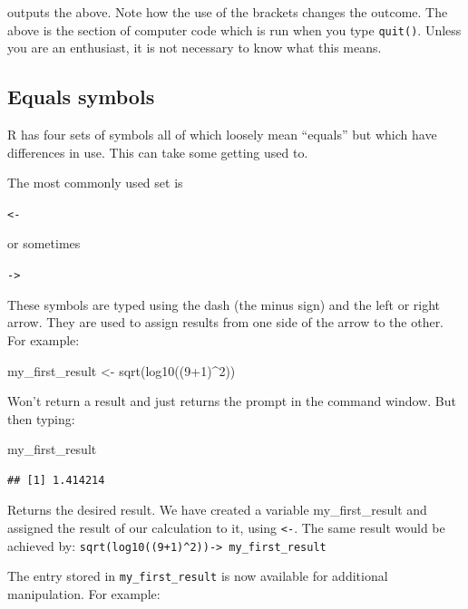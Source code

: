 \documentclass[
]{book}
\newenvironment{Shaded}{\begin{snugshade}}{\end{snugshade}}
\newcommand{\DecValTok}[1]{\textcolor[rgb]{0.00,0.00,0.81}{#1}}
\newcommand{\FunctionTok}[1]{\textcolor[rgb]{0.00,0.00,0.00}{#1}}
\newcommand{\NormalTok}[1]{#1}
\newcommand{\OtherTok}[1]{\textcolor[rgb]{0.56,0.35,0.01}{#1}}
\newcommand{\SpecialCharTok}[1]{\textcolor[rgb]{0.00,0.00,0.00}{#1}}
\begin{document}
outputs the above. Note how the use of the brackets changes the outcome. The above is the section of computer code which is run when you type \texttt{quit()}. Unless you are an enthusiast, it is not necessary to know what this means.

\hypertarget{equals-symbols}{%
\subsection{Equals symbols}\label{equals-symbols}}

R has four sets of symbols all of which loosely mean ``equals'' but which have differences in use. This can take some getting used to.

The most commonly used set is

\texttt{\textless{}-}

or sometimes

\texttt{-\textgreater{}}

These symbols are typed using the dash (the minus sign) and the left or right arrow. They are used to assign results from one side of the arrow to the other. For example:

\begin{Shaded}
\begin{Highlighting}[]
\NormalTok{my\_first\_result }\OtherTok{\textless{}{-}} \FunctionTok{sqrt}\NormalTok{(}\FunctionTok{log10}\NormalTok{((}\DecValTok{9}\SpecialCharTok{+}\DecValTok{1}\NormalTok{)}\SpecialCharTok{\^{}}\DecValTok{2}\NormalTok{))}
\end{Highlighting}
\end{Shaded}

Won't return a result and just returns the prompt in the command window. But then typing:

\begin{Shaded}
\begin{Highlighting}[]
\NormalTok{my\_first\_result}
\end{Highlighting}
\end{Shaded}

\begin{verbatim}
## [1] 1.414214
\end{verbatim}

Returns the desired result. We have created a variable my\_first\_result and assigned the result of our calculation to it, using \texttt{\textless{}-}. The same result would be achieved by: \texttt{sqrt(log10((9+1)\^{}2))-\textgreater{}\ my\_first\_result}

The entry stored in \texttt{my\_first\_result} is now available for additional manipulation. For example:
\end{document}
